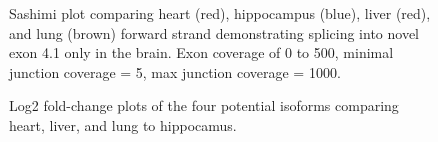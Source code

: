 \begin{figure}
  \centering
  \caption{Sashimi plot comparing heart (red), hippocampus (blue), liver (red), and lung (brown) forward strand demonstrating splicing into novel exon 4.1 only in the brain. Exon coverage of 0 to 500, minimal junction coverage = 5, max junction coverage = 1000.}
  \label{sense tissue splicing}
\end{figure}

\begin{figure}
  \centering
  \caption{Log2 fold-change plots of the four potential isoforms comparing heart, liver, and lung  to hippocamus.}
  \label{sense tissue fold-change}
\end{figure}

